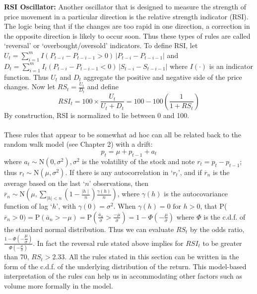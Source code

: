 \noindent \textbf{RSI Oscillator:} Another oscillator that is designed to measure the strength of price movement in a particular direction is the relative strength indicator (RSI). The logic being that if the changes are too rapid in one direction, a correction in the opposite direction is likely to occur soon. Thus these types of rules are called `reversal' or `overbought/oversold' indicators. To define RSI, let $U_{t} = \sum_{i=1}^m I(P_{t-i} - P_{t-i-1} > 0)\,|P_{t-i} - P_{t-i-1}|$ and $D_{t} = \sum_{i=1}^m I_{t}(P_{t-i} - P_{t-i-1} < 0)\,|S_{t-i} - S_{t-i-1}|$ where $I(\cdot)$ is an indicator function. Thus $U_t$ and $D_t$ aggregate the positive and negative side of the price changes. Now let $RS_{t} = \frac {U_{t}}{D_{t}}$ and define
	\begin{equation}\label{eqn:rsi}
	RSI_{t} = 100 \times \frac{U_{t}}{U_{t}+D_{t}} = 100 - 100\left(\dfrac{1}{1+RS_t}\right)
	\end{equation}
By construction, RSI is normalized to lie between 0 and 100. \\[0.1cm]


\noindent{} \\


These rules that appear to be somewhat ad hoc can all be related back to the random walk model (see Chapter 2) with a drift:
	\begin{equation}\label{eqn:anotherpt}
	p_t = \mu+p_{t-1}+a_t
	\end{equation}
where $a_t \sim \text{N}(0,\sigma^2), \sigma^2$ is the volatility of the stock and note $r_t=p_t-p_{t-1}$; thus  $r_t \sim \text{N}(\mu,\sigma^2)$. If there is any autocorrelation in `$r_t$', and if $\overline{r}_n$ is the average based on the last `$n$' observations, then $\overline{r}_n \sim \text{N}\left(\mu,\sum_{\mid h \mid < n}\left(1-\frac{\mid h \mid}{n}\right)\frac{\gamma(h)}{n}\right)$, where $\gamma(h)$ is the autocovariance function of lag `$h$', with $\gamma(0)=\sigma^2$. When $\gamma(h)=0 \text{ for } h>0$, that P($\overline{r}_n>0)=\text{P}(\overline{a}_n>-\mu)=\text{P}\left(\frac{\overline{a}_n}{\sigma}>\frac{-\mu}{\sigma}\right)=1-\Phi\left(-\frac{\mu}{\sigma}\right)$ where $\Phi$ is the c.d.f. of the standard normal distribution. Thus we can evaluate $RS_t$ by the odds ratio, $\frac{1-\Phi\left(-\dfrac{\mu}{\sigma}\right)}{\Phi\left(-\frac{\mu}{\sigma}\right)}$. In fact the reversal rule stated above implies for $RSI_t$ to be greater than 70, $RS_t>2.33$. All the rules stated in this section can be written in the form of the c.d.f. of the underlying distribution of the return. This model-based interpretation of the rules can help us in accommodating other factors such as volume more formally in the model. 


